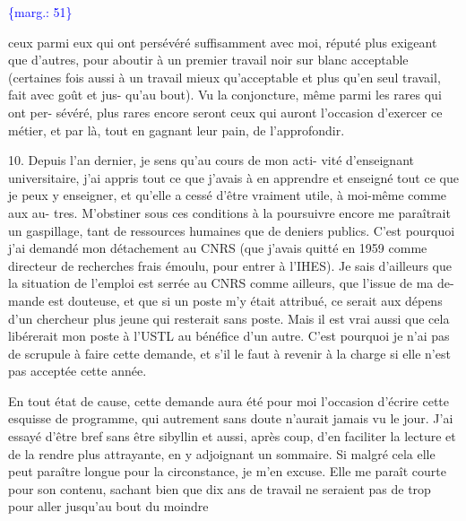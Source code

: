\documentclass[11pt]{article}
\newcommand{\scanpage}[1]{\par\bigskip\noindent{\small\sffamily[scan #1]}\par}
\newcommand{\mspage}[1]{{\small\sffamily[p.\,#1]}}
\newcommand{\margin}[1]{\textcolor{blue}{\{\textsf{marg.:} #1\}}}
\begin{document}
\margin{51}

\clearpage
\scanpage{119/52}
\mspage{50}

ceux parmi eux qui ont persévéré suffisamment avec moi, réputé
plus exigeant que d'autres, pour aboutir à un premier travail
noir sur blanc acceptable (certaines fois aussi à un travail mieux
qu'acceptable et plus qu'en seul travail, fait avec goût et jus-%
qu'au bout). Vu la conjoncture, même parmi les rares qui ont per-%
sévéré, plus rares encore seront ceux qui auront l'occasion
d'exercer ce métier, et par là, tout en gagnant leur pain, de
l'approfondir.

10. Depuis l'an dernier, je sens qu'au cours de mon acti-%
vité d'enseignant universitaire, j'ai appris tout ce que j'avais
à en apprendre et enseigné tout ce que je peux y enseigner, et
qu'elle a cessé d'être vraiment utile, à moi-même comme aux au-%
tres. M'obstiner sous ces conditions à la poursuivre encore me
paraîtrait un gaspillage, tant de ressources humaines que de deniers
publics. C'est pourquoi j'ai demandé mon détachement au CNRS (que
j'avais quitté en 1959 comme directeur de recherches frais émoulu,
pour entrer à l'IHES). Je sais d'ailleurs que la situation de
l'emploi est serrée au CNRS comme ailleurs, que l'issue de ma de-%
mande est douteuse, et que si un poste m'y était attribué, ce serait
aux dépens d'un chercheur plus jeune qui resterait sans poste.
Mais il est vrai aussi que cela libérerait mon poste à l'USTL au
bénéfice d'un autre. C'est pourquoi je n'ai pas de scrupule à
faire cette demande, et s'il le faut à revenir à la charge si elle
n'est pas acceptée cette année.

En tout état de cause, cette demande aura été pour moi
l'occasion d'écrire cette esquisse de programme, qui autrement sans
doute n'aurait jamais vu le jour. J'ai essayé d'être bref sans être
sibyllin et aussi, après coup, d'en faciliter la lecture et de
la rendre plus attrayante, en y adjoignant un sommaire. Si malgré
cela elle peut paraître longue pour la circonstance, je m'en excuse.
Elle me paraît courte pour son contenu, sachant bien que dix ans de
travail ne seraient pas de trop pour aller jusqu'au bout du moindre
\end{document}
